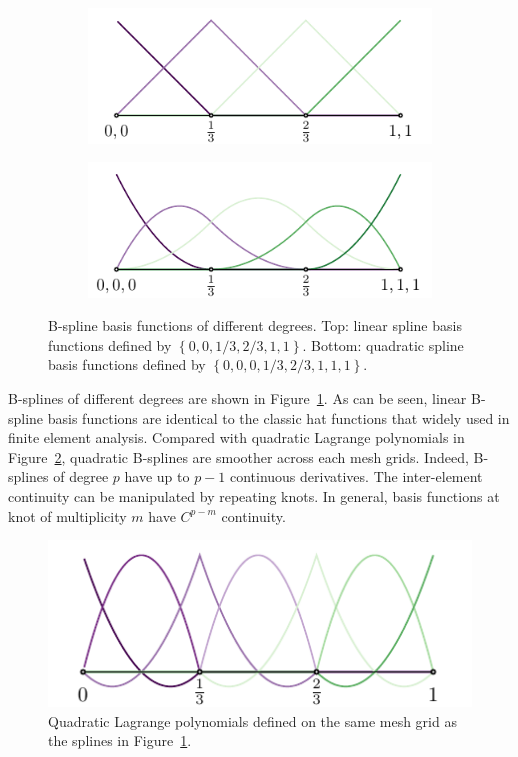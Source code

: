 \begin{figure}[ht]
    \center
    \begin{subfigure}[t]{\linewidth}
        \center
        \includegraphics[scale=1.2]{p=1_space}
    \end{subfigure}
    \begin{subfigure}[t]{\linewidth}
        \center
        \includegraphics[scale=1.2]{p=2_space}
    \end{subfigure}
    \caption[B-spline basis functions of different degrees.]{B-spline basis functions of different degrees. Top: linear spline basis functions defined by $\left\{0,0,1/3,2/3,1,1\right\}$. Bottom: quadratic spline basis functions defined by $\left\{0,0,0,1/3,2/3,1,1,1\right\}$.}\label{fig:spline_basis}
\end{figure}

B-splines of different degrees are shown in Figure~\ref{fig:spline_basis}. As can be seen, linear B-spline basis functions are identical to the classic hat functions that widely used in finite element analysis. Compared with quadratic Lagrange polynomials in Figure~\ref{fig:lagrange_polynomial}, quadratic B-splines are smoother across each mesh grids. Indeed, B-splines of degree $p$ have up to $p-1$ continuous derivatives. The inter-element continuity can be manipulated by repeating knots. In general, basis functions at knot of multiplicity $m$ have $C^{p-m}$ continuity.

\begin{figure}[ht]
    \center\includegraphics[scale=1.2]{p=2_space_2}
    \caption{Quadratic Lagrange polynomials defined on the same mesh grid as the splines in Figure~\ref{fig:spline_basis}.}\label{fig:lagrange_polynomial}
\end{figure}



